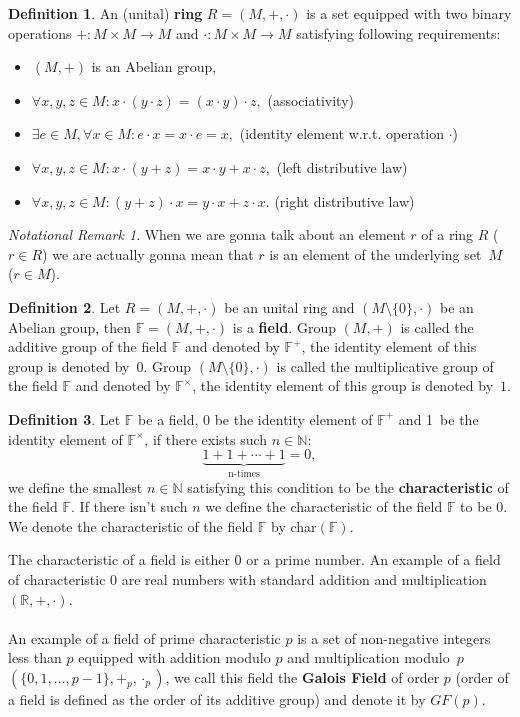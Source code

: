 \documentclass[thesis=M,english]{FITthesis}[2012/10/20]
\theoremstyle{remark}
\newtheorem*{NRM}{Notational Remark}
\theoremstyle{definition}
\newtheorem{DF}{Definition}[section]
\begin{document}
\begin{DF}
An (unital) \textbf{ring} $R = (M, +, \cdot)$  is a set equipped with two binary operations $+: M\times M \to M$ and $\cdot:  M\times M \to M$ satisfying following requirements:
\begin{itemize}
\item $(M, +)$ is an Abelian group, 
\item $\forall x,y,z \in M: x\cdot(y\cdot z) = (x \cdot y) \cdot z, $ \hfill (associativity)
\item $\exists e \in M,\forall x \in M: e \cdot x = x \cdot e = x,$ \hfill (identity element w.r.t. operation $\cdot$)
\item $\forall x,y,z \in M:x \cdot(y+z)= x\cdot y + x \cdot z,$ \hfill (left distributive law) 
\item $\forall x,y, z \in M:(y + z) \cdot x = y\cdot x + z \cdot x.$ \hfill(right distributive law)
\end{itemize}
\end{DF}
\begin{NRM}
When we are gonna talk about an element $r$ of a ring $R$ ($r \in R$) we are actually gonna mean that $r$ is an element of the underlying set~$M$ ($r \in M$).
\end{NRM}
\begin{DF}
Let $R = (M,+,\cdot)$ be an unital ring and $(M \setminus \{0\}, \cdot)$ be an Abelian group, then $\mathbb{F} = (M, +, \cdot)$ is a \textbf{field}. Group $(M, +)$ is  called the additive group of the field $\mathbb{F}$ and denoted by $\mathbb{F}^+$, the identity element of this group is denoted by~$0$. Group $(M \setminus \{0\}, \cdot)$ is called the multiplicative group of the field $\mathbb{F}$ and denoted by $\mathbb{F}^\times$, the identity element of this group is denoted by~$1$.
\end{DF}
\begin{DF}
Let $\mathbb{F}$ be a field, 0 be the identity element of $\mathbb{F}^+$ and 1~be the identity element of $\mathbb{F}^\times$, if there exists such $n \in \mathbb{N}:$
$$
 \underbrace{1 + 1 + \cdots + 1}_\text{n-times} = 0,
$$ we define the smallest $n \in \mathbb{N}$ satisfying this condition to be the \textbf{characteristic} of the field $\mathbb{F}.$ If there isn't such $n$ we define the characteristic of the field $\mathbb{F}$ to be $0$. We denote the characteristic of the field $\mathbb{F}$ by char$(\mathbb{F})$.
\end{DF}
\noindent The characteristic of a field is either $0$ or a prime number. An example of a field of characteristic $0$ are real numbers with standard addition and multiplication $(\mathbb{R}, +, \cdot)$. \\ \\
An example of a field of prime characteristic $p$ is a set of non-negative integers less than $p$ equipped with addition modulo $p$ and multiplication modulo~$p$ $(\{0, 1, \ldots, p-1\}, +_p, \cdot_p)$, we call this field the \textbf{Galois Field} of order $p$ (order of a field is defined as the order of its additive group) and denote it by $GF(p)$.
\end{document}
